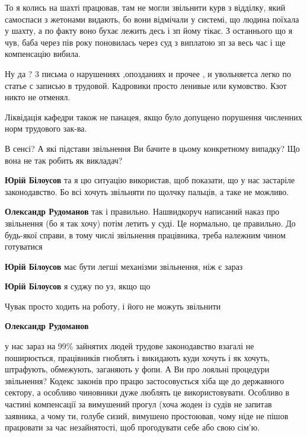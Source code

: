 \begin{itemize}
То я колись на шахті працював, там не могли звільнити курв з відділку, який самоспаси з жетонами видають, бо вони відмічали у системі, що людина поїхала у шахту, а по факту воно бухає лежить десь і зп йому тікає.
З останнього що я чув, баба через пів року поновилась через суд з виплатою зп за весь час і ще компенсацію вибила.

Ну да ? 3 письма о нарушениях ,опозданиях и прочее , и увольняетса легко по статье с записью в трудовой. Кадровики просто ленивые или кумовство. Кзот никто не отменял.

Ліквідація кафедри також не панацея, якщо було допущено порушення численних норм трудового зак-ва.

В сенсі? А які підстави звільнення Ви бачите в цьому конкретному випадку? Що вона не так робить як викладач?

\begin{itemize} %
\textbf{Юрій Білоусов} та я цю ситуацію використав, щоб показати, що у нас застаріле законодавство. Бо всі хочуть звільняти по щолчку пальців, а таке не можливо.

\textbf{Олександр Рудоманов} так і правильно. Нашвидкоруч написаний наказ про звільнення (бо я так хочу) потім летить у суді. Це нормально, це правильно. До будь-якої справи, в тому числі звільнення працівника, треба належним чином готуватися


\textbf{Юрій Білоусов} має бути легші механізми звільнення, ніж є зараз


\textbf{Юрій Білоусов} я суджу по уз, якщо що


Чувак просто ходить на роботу, і його не можуть звільнити

\textbf{Олександр Рудоманов} 

у нас зараз на 99\% зайнятих людей трудове законодавство взагалі не
поширюється, працівників гноблять і викидають куди хочуть і як хочуть,
штрафують, обмежують, заганяють у фопи. А Ви про лояльні процедури звільнення?
Кодекс законів про працю застосовується хіба ще до державного сектору, а
особливо чиновники дуже люблять це використовувати. Особливо в частині
компенсації за вимушений прогул (хоча жоден із судів не запитав заявника, а
чому ти, голубе сизий, вимушено простоював, чому ніде не пішов працювати за час
незайнятості, щоб прогодувати себе або свою сім'ю.


\end{itemize}
\end{itemize}
